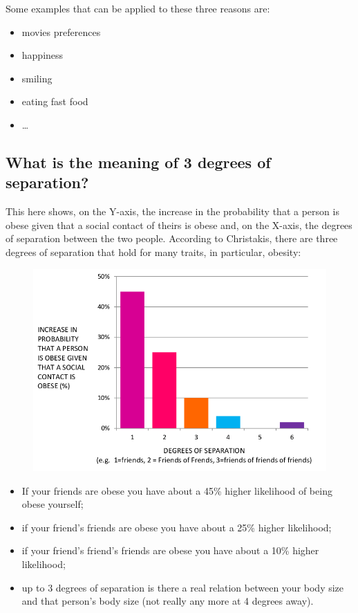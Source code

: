 \documentclass[
  notitlepage,
  onecolumn,
  openany]{book}
\providecommand{\tightlist}{%
  \setlength{\itemsep}{0pt}\setlength{\parskip}{0pt}}
\begin{document}
Some examples that can be applied to these three reasons are:

\begin{itemize}
\tightlist
\item
  movies preferences
\item
  happiness
\item
  smiling
\item
  eating fast food
\item
  \ldots{}
\end{itemize}

\hypertarget{what-is-the-meaning-of-3-degrees-of-separation}{%
\subsection{What is the meaning of 3 degrees of separation?}\label{what-is-the-meaning-of-3-degrees-of-separation}}

This here shows, on the Y-axis, the increase in the probability that a person is obese given that a social contact of theirs is obese and, on the X-axis, the degrees of separation between the two people. According to Christakis, there are three degrees of separation that hold for many traits, in particular, obesity:

\begin{figure}[h!]

{\centering \includegraphics[width=0.5\linewidth]{images/14-Christakis and Valente/Untitled} 

}

\end{figure}

\begin{itemize}
\tightlist
\item
  If your friends are obese you have about a 45\% higher likelihood of being obese yourself;
\item
  if your friend's friends are obese you have about a 25\% higher likelihood;
\item
  if your friend's friend's friends are obese you have about a 10\% higher likelihood;
\item
  up to 3 degrees of separation is there a real relation between your body size and that person's body size (not really any more at 4 degrees away).
\end{itemize}
\end{document}
